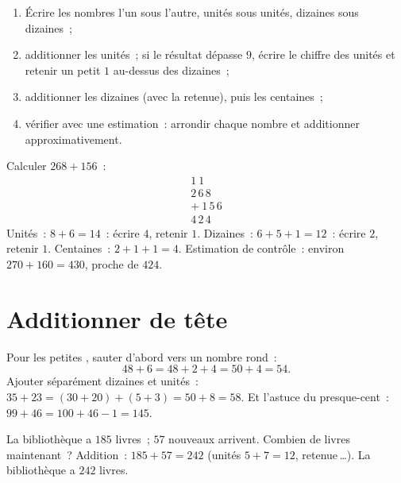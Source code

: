 \begin{method}\label{met:g2:addition:column}
\begin{enumerate}
  \item Écrire les nombres l'un sous l'autre, unités sous
        unités, dizaines sous dizaines~;
  \item additionner les unités~; si le résultat dépasse $9$,
        écrire le chiffre des unités et retenir un petit $1$
        au-dessus des dizaines~;
  \item additionner les dizaines (avec la retenue), puis les
        centaines~;
  \item vérifier avec une estimation~: arrondir chaque nombre et
        additionner approximativement.
\end{enumerate}
\end{method}

\begin{example}\label{ex:g2:addition:worked}
Calculer $268 + 156$~:
\[
\begin{array}{r}
{\scriptstyle 1}\ {\scriptstyle 1}\ \phantom{0} \\[-3pt]
2\,6\,8 \\
+\ 1\,5\,6 \\
\hline
4\,2\,4
\end{array}
\]
Unités~: $8 + 6 = 14$~: écrire $4$, retenir $1$. Dizaines~:
$6 + 5 + 1 = 12$~: écrire $2$, retenir $1$. Centaines~:
$2 + 1 + 1 = 4$. Estimation de contrôle~: environ
$270 + 160 = 430$, proche de $424$. \checkmark
\end{example}

\section{Additionner de tête}

\begin{example}\label{ex:g2:addition:mental}
Pour les petites , sauter d'abord vers un nombre rond~:
\[
48 + 6 = 48 + 2 + 4 = 50 + 4 = 54 .
\]
Ajouter séparément dizaines et unités~:
$35 + 23 = (30 + 20) + (5 + 3) = 50 + 8 = 58$. Et l'astuce du
presque-cent~: $99 + 46 = 100 + 46 - 1 = 145$.
\end{example}

\begin{example}\label{ex:g2:addition:problem}
\guillemotleft{} La bibliothèque a $185$ livres~; $57$ nouveaux
arrivent. Combien de livres maintenant~? \guillemotright{}
Addition~: $185 + 57 = 242$ (unités $5 + 7 = 12$,
retenue\,\dots). La bibliothèque a $242$ livres.
\end{example}

